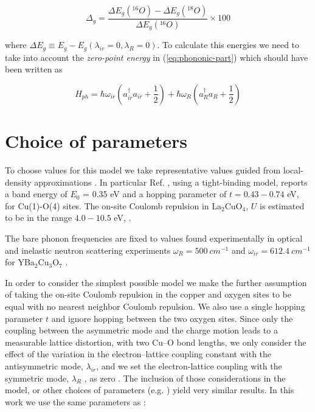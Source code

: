 \begin{equation}\label{eq:isot-shift-def-grd}
\Delta_g = \frac{\Delta E_g(^{16}O)- \Delta E_g(^{18}O)}{\Delta E_g(^{16}O)} \times 100
\end{equation}

where $\Delta E_g \equiv E_g - E_g(\lambda_{ir}=0, \lambda_R=0)$. To calculate this energies we need to take into account the \textit{zero-point energy} in (\ref{eq:phononic-part}) which should have been written as 

\begin{equation}\label{eq:phononic-part-complete}
H_{ph} = \hbar \omega_{ir} \left( a_{ir}^\dagger a_{ir} + \frac{1}{2}\right) + \hbar \omega_R\left( a_R^\dagger a_R + \frac{1}{2} \right)
\end{equation}


\section{Choice of parameters}

To choose values for this model we take representative values guided from local-density approximations \cite{Pickett1989}. 
In particular Ref. \cite{DeWeert1989}, using a tight-binding model, reports a band energy of $E_0$ = 0.35 eV and a hopping parameter of $t=0.43-0.74$ eV, for Cu(1)-O(4) sites.
The on-site Coulomb repulsion in La$_2$CuO$_4$, $U$  is estimated to be in the range $4.0-10.5$ eV, \cite{Hybertsen1989}. 

The bare phonon frequencies are fixed to values found experimentally in optical and inelastic neutron scattering experiments $\omega_R = 500\ cm^{-1}$ and $\omega_{ir} = 612.4\ cm^{-1}$ for YBa$_2$Cu$_3$O$_7$ \cite{?}.

In order to consider the simplest possible model we make the further assumption of taking the on-site Coulomb repulsion in the copper and oxygen sites to be equal with no nearest neighbor Coulomb repulsion. 
We also use a single hopping parameter $t$ and ignore hopping between the two oxygen sites. 
Since only the coupling between the asymmetric mode and the charge motion leads to a measurable lattice distortion, with two Cu–O bond lengths, we only consider the effect of the variation in the electron–lattice coupling constant with the antisymmetric mode, $\lambda_{ir}$, and we set the electron-lattice coupling with the symmetric mode, $\lambda_R$ , as zero \cite{Salkola1995}. 
The inclusion of those considerations in the model, or other choices of parameters (e.g. \cite{Salkola1994, Salkola1995}) yield very similar results.
In this work we use the same parameters as \cite{Mena2006, DeLeon1999, Leon2008, MirandaMena2007}:

